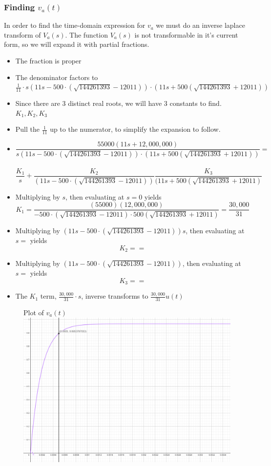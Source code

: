 \documentclass[11pt]{article}
\begin{document}
	\subsubsection*{Finding $v_a(t)$}
	In order to find the time-domain expression for $v_a$ we must do an inverse laplace transform of $V_a(s)$. The function $V_a(s)$ is not transformable in it's current form, so we will expand it with partial fractions.
	\begin{itemize}
		\item The fraction is proper
		\item The denominator factors to $\frac{1}{11}\cdot s(11s-500\cdot (\sqrt{144261393}-12011))\cdot (11s+500(\sqrt{144261393}+12011))$
		\item Since there are 3 distinct real roots, we will have 3 constants to find. $K_1,K_2,K_3$
		\item Pull the $\frac{1}{11}$ up to the numerator, to simplify the expansion to follow.
		\item \[ \frac{55000(11s+12,000,000)}{s(11s-500\cdot (\sqrt{144261393}-12011))\cdot (11s+500(\sqrt{144261393}+12011))} =\] \\ \[ \frac{K_1}{s} + \frac{K_2}{(11s-500\cdot (\sqrt{144261393}-12011))} \frac{K_3}{(11s+500(\sqrt{144261393}+12011)}\]
		\item Multiplying by $s$, then evaluating at $s=0$ yields \[K_1=\frac{(55000)(12,000,000)}{-500\cdot (\sqrt{144261393}-12011)\cdot 500(\sqrt{144261393}+12011)} = \frac{30,000}{31}\]
		\item Multiplying by $(11s-500\cdot (\sqrt{144261393}-12011))s$, then evaluating at $s= $ yields \[K_2 = = \]
		\item Multiplying by $(11s-500\cdot (\sqrt{144261393}-12011))$, then evaluating at $s= $ yields \[K_3 = = \]
		
		
		\item The $K_1$ term, $\frac{30,000}{31}\cdot s$, inverse transforms to $\frac{30,000}{31}u(t)$
	\end{itemize}
	
	\begin{figure}[H]
		\centering
		Plot of $v_a(t)$\\
		\includegraphics[width=6.55in]{images/function_graph.png}
	\end{figure}
	
\end{document}
